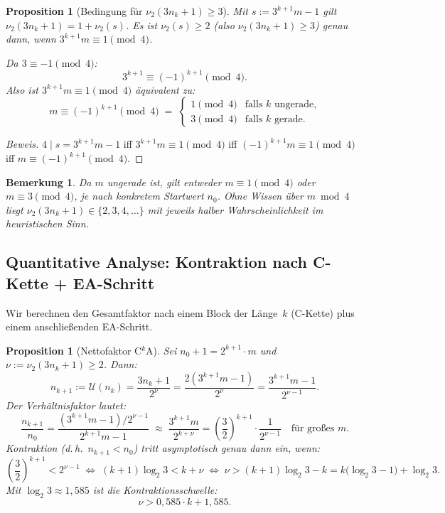 \documentclass[12pt,a4paper]{article}
\newtheorem{proposition}[definition]{Proposition}
\newtheorem{bemerkung}[definition]{Bemerkung}
\newenvironment{beweis}{\begin{proof}[Beweis]}{\end{proof}}
\newcommand{\vii}{\nu_2}
\newcommand{\U}{\mathcal{U}}
\begin{document}
\begin{proposition}[Bedingung für $\vii(3n_k+1) \geq 3$]
\label{prop:nu3-nach-ck}
Mit $s := 3^{k+1}m - 1$ gilt $\vii(3n_k+1) = 1 + \vii(s)$. Es ist
$\vii(s) \geq 2$ (also $\vii(3n_k+1) \geq 3$) genau dann, wenn
$3^{k+1} m \equiv 1 \pmod{4}$.

Da $3 \equiv -1 \pmod 4$:
\[
  3^{k+1} \equiv (-1)^{k+1} \pmod 4.
\]
Also ist $3^{k+1}m \equiv 1 \pmod 4$ äquivalent zu:
\[
  m \equiv (-1)^{k+1} \pmod 4
  \;=\;
  \begin{cases}
    1 \pmod 4 & \text{falls $k$ ungerade,}\\
    3 \pmod 4 & \text{falls $k$ gerade.}
  \end{cases}
\]
\end{proposition}

\begin{beweis}
$4 \mid s = 3^{k+1}m - 1$ iff $3^{k+1}m \equiv 1 \pmod 4$ iff
$(-1)^{k+1}m \equiv 1 \pmod 4$ iff $m \equiv (-1)^{k+1} \pmod 4$.
\end{beweis}

\begin{bemerkung}
Da $m$ ungerade ist, gilt entweder $m \equiv 1 \pmod 4$ oder $m \equiv 3 \pmod 4$,
je nach konkretem Startwert $n_0$. Ohne Wissen über $m \bmod 4$ liegt
$\vii(3n_k+1) \in \{2, 3, 4, \ldots\}$ mit jeweils halber Wahrscheinlichkeit
im heuristischen Sinn.
\end{bemerkung}

\subsection{Quantitative Analyse: Kontraktion nach C-Kette + EA-Schritt}

Wir berechnen den Gesamtfaktor nach einem Block der Länge~$k$ (C-Kette) plus
einem anschließenden EA-Schritt.

\begin{proposition}[Nettofaktor C$^k$A]
\label{prop:ck-a-faktor}
Sei $n_0+1 = 2^{k+1} \cdot m$ und $\nu := \vii(3n_k+1) \geq 2$. Dann:
\[
  n_{k+1} := \U(n_k) = \frac{3n_k+1}{2^\nu} = \frac{2(3^{k+1}m-1)}{2^\nu}
           = \frac{3^{k+1}m - 1}{2^{\nu-1}}.
\]
Der Verhältnisfaktor lautet:
\[
  \frac{n_{k+1}}{n_0}
  = \frac{(3^{k+1}m - 1)/2^{\nu-1}}{2^{k+1}m - 1}
  \;\approx\; \frac{3^{k+1}m}{2^{k+\nu}}
  = \left(\frac{3}{2}\right)^{k+1} \cdot \frac{1}{2^{\nu-1}}
  \quad\text{für großes }m.
\]
Kontraktion (d.\,h.\ $n_{k+1} < n_0$) tritt asymptotisch genau dann ein, wenn:
\[
  \left(\frac{3}{2}\right)^{k+1} < 2^{\nu-1}
  \;\Longleftrightarrow\;
  (k+1)\log_2 3 < k + \nu
  \;\Longleftrightarrow\;
  \nu > (k+1)\log_2 3 - k = k\bigl(\log_2 3 - 1\bigr) + \log_2 3.
\]
Mit $\log_2 3 \approx 1{,}585$ ist die Kontraktionsschwelle:
\[
  \nu > 0{,}585 \cdot k + 1{,}585.
\]
\end{proposition}
\end{document}
